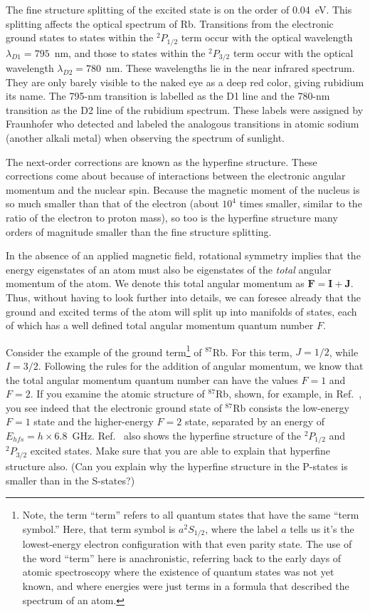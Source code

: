 \documentclass{../lab}
\begin{document}
The fine structure splitting of the excited state is on the order of 0.04~eV.  This splitting affects the optical spectrum of Rb.  Transitions from the electronic ground states to states within the $^2P_{1/2}$ term occur with the optical wavelength $\lambda_{D1} = 795$~nm, and those to states within the $^2P_{3/2}$ term occur with the optical wavelength $\lambda_{D2} = 780$~nm.  These wavelengths lie in the near infrared spectrum. They are only barely visible to the naked eye as a deep red color, giving rubidium its name.  The 795-nm transition is labelled as the D1 line and the 780-nm transition as the D2 line of the rubidium spectrum.  These labels were assigned by Fraunhofer who detected and labeled the analogous transitions in atomic sodium (another alkali metal) when observing the spectrum of sunlight.

The next-order corrections are known as the hyperfine structure.  These corrections come about because of interactions between the electronic angular momentum and the nuclear spin.  Because the magnetic moment of the nucleus is so much smaller than that of the electron (about $10^4$ times smaller, similar to the ratio of the electron to proton mass), so too is the hyperfine structure many orders of magnitude smaller than the fine structure splitting.

In the absence of an applied magnetic field, rotational symmetry implies that the energy eigenstates of an atom must also be eigenstates of the \emph{total} angular momentum of the atom.  We denote this total angular momentum as $\mathbf{F} = \mathbf{I} + \mathbf{J}$.  Thus, without having to look further into details, we can foresee already that the ground and excited terms of the atom will split up into manifolds of states, each of which has a well defined total angular momentum quantum number $F$.

Consider the example of the ground term\footnote{Note, the term ``term'' refers to all quantum states that have the same ``term symbol.''  Here, that term symbol is $a ^2S_{1/2}$, where the label $a$ tells us it's the lowest-energy electron configuration with that even parity state.  The use of the word ``term'' here is anachronistic, referring back to the early days of atomic spectroscopy where the existence of quantum states was not yet known, and where energies were just terms in a formula that described the spectrum of an atom.} of $^{87}$Rb.  For this term, $J = 1/2$, while $I = 3/2$.  Following the rules for the addition of angular momentum, we know that the total angular momentum quantum number can have the values $F=1$ and $F=2$.  If you examine the atomic structure of $^{87}$Rb, shown, for example, in Ref.\ \cite{RbDiagrams}, you see indeed that the electronic ground state of $^{87}$Rb consists the low-energy $F=1$ state and the higher-energy $F=2$ state, separated by an energy of $E_{hfs} = h \times 6.8$~GHz.  Ref.\ \cite{RbDiagrams} also shows the hyperfine structure of the $^2P_{1/2}$ and $^2P_{3/2}$ excited states.  Make sure that you are able to explain that hyperfine structure also. (Can you explain why the hyperfine structure in the P-states is smaller than in the S-states?)
\end{document}
